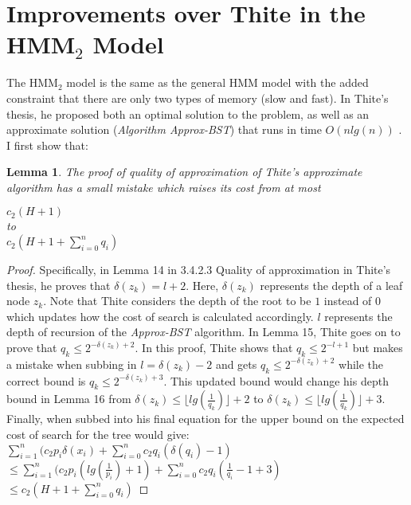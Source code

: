 \documentclass[letterpaper,12pt,titlepage,oneside,final]{book}
\theoremstyle{plain}
\newtheorem{lem}[thm]{Lemma}
\begin{document}
\section{Improvements over Thite in the HMM$_2$ Model}

The HMM$_2$ model is the same as the general HMM model with the added constraint that there are only two types of memory (slow and fast). In Thite's thesis, he proposed both an optimal solution to the problem, as well as an approximate solution (\textit{Algorithm Approx-BST}) that runs in time $O(n lg(n))$ \cite{thite2008optimum}. I first show that:
\begin{lem}
The proof of quality of approximation of Thite's approximate algorithm has a small mistake which raises its cost from at most \\
\begin{center}
$c_2(H+1)$\\
to \\
$c_2(H+1+\sum_{i=0}^{n}q_i)$
\end{center}
\end{lem}

\begin{proof}
Specifically, in Lemma 14 in 3.4.2.3 Quality of approximation in Thite's thesis, he proves that $\delta(z_k) = l+2$. Here, $\delta(z_k)$ represents the depth of a leaf node $z_k$. Note that Thite considers the depth of the root to be $1$ instead of $0$ which updates how the cost of search is calculated accordingly. $l$ represents the depth of recursion of the \textit{Approx-BST} algorithm. In Lemma 15, Thite goes on to prove that $q_k \leq 2^{-\delta(z_k)+2}$. In this proof, Thite shows that $q_k \leq 2^{-l+1}$ but makes a mistake when subbing in $l=\delta(z_k)-2$ and gets $q_k \leq 2^{-\delta(z_k)+2}$ while the correct bound is $q_k \leq 2^{-\delta(z_k)+3}$. This updated bound would change his depth bound in Lemma 16 from $\delta(z_k) \leq \lfloor lg(\frac{1}{q_k}) \rfloor + 2$ to $\delta(z_k) \leq \lfloor lg(\frac{1}{q_k}) \rfloor + 3$. Finally, when subbed into his final equation for the upper bound on the expected cost of search for the tree would give: \\

$\sum_{i=1}^{n}(c_2 p_i \delta(x_i )+ \sum_{i=0}^{n} c_2 q_i (\delta(q_i)-1)$ \\

$\leq \sum_{i=1}^{n}(c_2 p_i (lg(\frac{1}{p_i})+1)+ \sum_{i=0}^{n} c_2 q_i (\frac{1}{q_i}-1+3)$ \\

$\leq c_2(H+1+\sum_{i=0}^{n}q_i)$
\end{proof}
\end{document}
